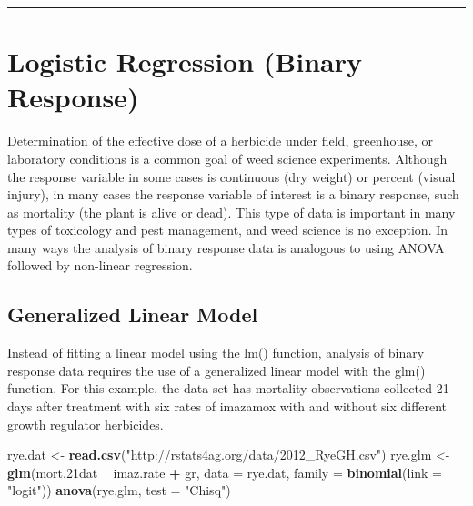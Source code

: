 \documentclass[letterpaper,]{book}
\newenvironment{Shaded}{\begin{snugshade}}{\end{snugshade}}
\newcommand{\DataTypeTok}[1]{\textcolor[rgb]{0.13,0.29,0.53}{#1}}
\newcommand{\FloatTok}[1]{\textcolor[rgb]{0.00,0.00,0.81}{#1}}
\newcommand{\KeywordTok}[1]{\textcolor[rgb]{0.13,0.29,0.53}{\textbf{#1}}}
\newcommand{\NormalTok}[1]{#1}
\newcommand{\OperatorTok}[1]{\textcolor[rgb]{0.81,0.36,0.00}{\textbf{#1}}}
\newcommand{\StringTok}[1]{\textcolor[rgb]{0.31,0.60,0.02}{#1}}
\begin{document}
\begin{center}\rule{0.5\linewidth}{0.5pt}\end{center}

\hypertarget{logistic-regression-binary-response}{%
\chapter{Logistic Regression (Binary Response)}\label{logistic-regression-binary-response}}

Determination of the effective dose of a herbicide under field, greenhouse, or laboratory conditions is a common goal of weed science experiments. Although the response variable in some cases is continuous (dry weight) or percent (visual injury), in many cases the response variable of interest is a binary response, such as mortality (the plant is alive or dead). This type of data is important in many types of toxicology and pest management, and weed science is no exception. In many ways the analysis of binary response data is analogous to using ANOVA followed by non-linear regression.

\hypertarget{generalized-linear-model}{%
\section{Generalized Linear Model}\label{generalized-linear-model}}

Instead of fitting a linear model using the lm() function, analysis of binary response data requires the use of a generalized linear model with the glm() function. For this example, the data set has mortality observations collected 21 days after treatment with six rates of imazamox with and without six different growth regulator herbicides.

\begin{Shaded}
\begin{Highlighting}[]
\NormalTok{rye.dat <-}\StringTok{ }\KeywordTok{read.csv}\NormalTok{(}\StringTok{"http://rstats4ag.org/data/2012_RyeGH.csv"}\NormalTok{)}
\NormalTok{rye.glm <-}\StringTok{ }\KeywordTok{glm}\NormalTok{(mort}\FloatTok{.21}\NormalTok{dat }\OperatorTok{~}\StringTok{ }\NormalTok{imaz.rate }\OperatorTok{+}\StringTok{ }\NormalTok{gr, }\DataTypeTok{data =}\NormalTok{ rye.dat, }
               \DataTypeTok{family =} \KeywordTok{binomial}\NormalTok{(}\DataTypeTok{link =} \StringTok{"logit"}\NormalTok{))}
\KeywordTok{anova}\NormalTok{(rye.glm, }\DataTypeTok{test =} \StringTok{"Chisq"}\NormalTok{)}
\end{Highlighting}
\end{Shaded}
\end{document}

